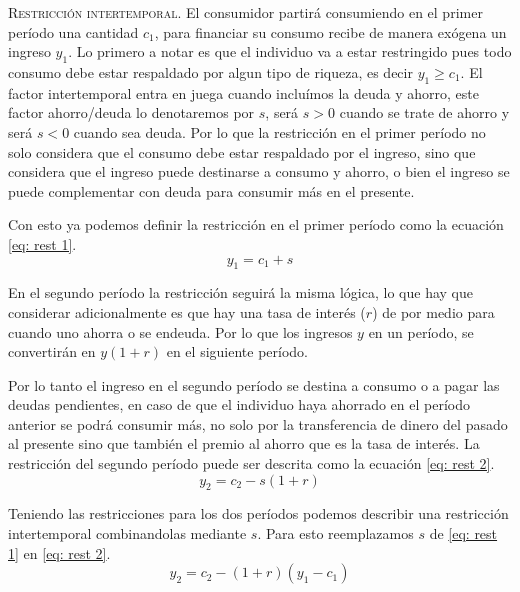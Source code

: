 \textsc{Restricción intertemporal}. El consumidor partirá consumiendo en el primer período una cantidad $c_1$, para financiar su consumo recibe de manera exógena un ingreso $y_1$. Lo primero a notar es que el individuo va a estar restringido pues todo consumo debe estar respaldado por algun tipo de riqueza, es decir $y_1 \geq c_1$. El factor intertemporal entra en juega cuando incluímos la deuda y ahorro, este factor ahorro/deuda lo denotaremos por $s$, será $s>0$ cuando se trate de ahorro y será $s<0$ cuando sea deuda. Por lo que la restricción en el primer período no solo considera que el consumo debe estar respaldado por el ingreso, sino que considera que el ingreso puede destinarse a consumo y ahorro, o bien el ingreso se puede complementar con deuda para consumir más en el presente.

Con esto ya podemos definir la restricción en el primer período como la ecuación \ref{eq: rest 1}.
\begin{equation}
    y_1 = c_1+s \label{eq: rest 1}
\end{equation}

En el segundo período la restricción seguirá la misma lógica, lo que hay que considerar adicionalmente es que hay una tasa de interés ($r$) de por medio para cuando uno ahorra o se endeuda. Por lo que los ingresos $y$ en un período, se convertirán en $y(1+r)$ en el siguiente período.

Por lo tanto el ingreso en el segundo período se destina a consumo o a pagar las deudas pendientes, en caso de que el individuo haya ahorrado en el período anterior se podrá consumir más, no solo por la transferencia de dinero del pasado al presente sino que también el premio al ahorro que es la tasa de interés. La restricción del segundo período puede ser descrita como la ecuación \ref{eq: rest 2}.
\begin{equation}
    y_2 = c_2 - s(1+r) \label{eq: rest 2}
\end{equation}

Teniendo las restricciones para los dos períodos podemos describir una restricción intertemporal combinandolas mediante $s$. Para esto reemplazamos $s$ de \ref{eq: rest 1} en \ref{eq: rest 2}.
\begin{equation*}
    y_2 = c_2 - (1+r)(y_1-c_1) 
\end{equation*}

